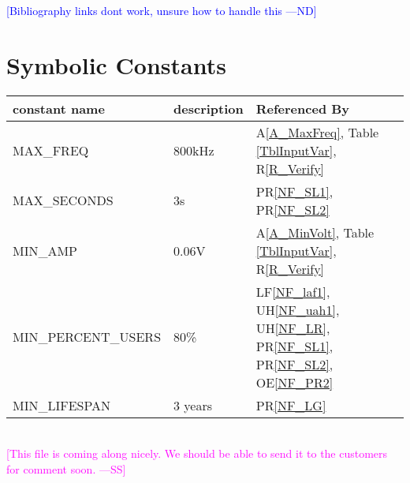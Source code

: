 \documentclass[12pt]{article}
\newcommand{\authornote}[3]{\textcolor{#1}{[#3 ---#2]}}
\newcommand{\authornote}[3]{}
\newcommand{\wss}[1]{\authornote{magenta}{SS}{#1}}
\newcommand{\nd}[1]{\authornote{blue}{ND}{#1}}
\begin{document}


\nd{Bibliography links dont work, unsure how to handle this}
\appendix

\section{Symbolic Constants} \label{AppendA}

\renewcommand{\arraystretch}{1.2}
\begin{tabular}{l l l}
  \toprule		
  \textbf{constant name} & \textbf{description} & \textbf{Referenced By}\\
  \midrule 
  MAX\_FREQ					&	800kHz		& A\ref{A_MaxFreq}, Table \ref{TblInputVar}, 
R\ref{R_Verify}\\
  MAX\_SECONDS				&	3s			& PR\ref{NF_SL1}, PR\ref{NF_SL2}\\
  MIN\_AMP					&	0.06V		& A\ref{A_MinVolt}, Table \ref{TblInputVar}, 
R\ref{R_Verify}\\
  MIN\_PERCENT\_USERS		&	80\%		& LF\ref{NF_laf1}, UH\ref{NF_uah1}, 
UH\ref{NF_LR}, PR\ref{NF_SL1}, PR\ref{NF_SL2}, OE\ref{NF_PR2}\\
  MIN\_LIFESPAN				&	3 years		& PR\ref{NF_LG}\\
  \bottomrule
\end{tabular}\\

\wss{This file is coming along nicely.  We should be able to send it to the
  customers for comment soon.}
\end{document}
